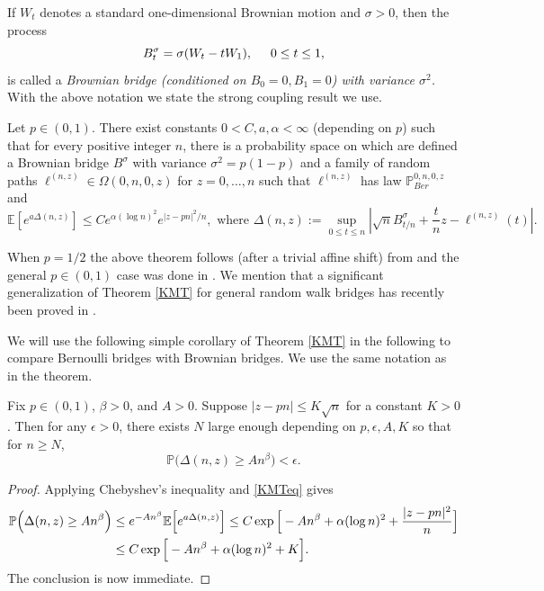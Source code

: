 If $W_t$ denotes a standard one-dimensional Brownian motion and $\sigma > 0$, then the process
$$B^{\sigma}_t = \sigma (W_t - t W_1), \hspace{5mm} 0 \leq t \leq 1,$$
is called a {\em Brownian bridge (conditioned on $B_0 = 0, B_1 = 0$)  with variance $\sigma^2$.}  With the above notation we state the strong coupling result we use.
\begin{theorem}\label{KMT}
Let $p \in (0,1)$. There exist constants $0 < C, a, \alpha < \infty$ (depending on $p$) such that for every positive integer $n$, there is a probability space on which are defined a Brownian bridge $B^\sigma$ with variance $\sigma^2 = p(1-p)$ and a family of random paths $\ell^{(n,z)} \in \Omega(0,n, 0, z)$ for $z = 0,\dots,n$ such that $\ell^{(n,z)}$ has law $\mathbb{P}^{0,n,0,z}_{Ber}$ and
\begin{equation}\label{KMTeq}
\mathbb{E}\left[ e^{a \Delta(n,z)} \right] \leq C e^{\alpha (\log n)^2}e^{|z- p n|^2/n}, \mbox{ where $\Delta(n,z):=  \sup_{0 \leq t \leq n} \left| \sqrt{n} B^\sigma_{t/n} + \frac{t}{n}z - \ell^{(n,z)}(t) \right|.$}
\end{equation}
\end{theorem}
\begin{remark} When $p = 1/2$ the above theorem follows (after a trivial affine shift) from \cite[Theorem 6.3]{LF} and the general $p \in (0,1)$ case was done in \cite[Theorem 4.5]{CD}. We mention that a significant generalization of Theorem \ref{KMT} for general random walk bridges has recently been proved in \cite[Theorem 2.3]{DW19}.
\end{remark}

We will use the following simple corollary of Theorem \ref{KMT} in the following to compare Bernoulli bridges with Brownian bridges. We use the same notation as in the theorem.

\begin{corollary}\label{Cheb}
	Fix $p\in (0,1)$, $\beta > 0$, and $A>0$. Suppose $|z-pn| \leq K\sqrt{n}$ for a constant $K>0$. Then for any $\epsilon > 0$, there exists $N$ large enough depending on $p,\epsilon,A,K$ so that for $n\geq N$,
	\[
	\mathbb{P}\Big(\Delta(n,z) \geq An^\beta\Big) < \epsilon.
	\]
\end{corollary}

\begin{proof}
	Applying Chebyshev's inequality and \eqref{KMTeq} gives
	\begin{align*}
	\mathbb{P}\Big(\Delta(n,z) \geq An^\beta\Big) &\leq e^{-An^\beta}\mathbb{E}\Big[e^{a\Delta(n,z)}\Big] \leq C\exp\Big[-An^\beta + \alpha(\log n)^2 + \frac{|z-pn|^2}{n}\Big]\\
	&\leq C\exp\Big[-An^\beta + \alpha(\log n)^2 + K\Big].
	\end{align*}
	The conclusion is now immediate.
\end{proof}

